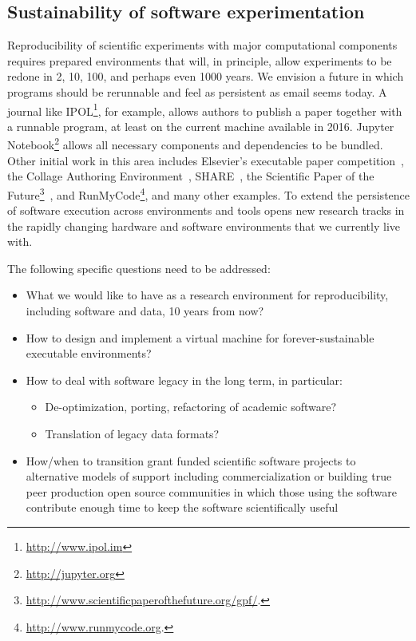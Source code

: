 \documentclass[a4paper,UKenglish]{dagman}
\begin{document}
\subsection{Sustainability of software experimentation}

Reproducibility of scientific experiments with major computational components requires prepared environments that will, in principle, allow experiments to be redone in 2, 10, 100, and perhaps even 1000 years. We envision a future in which programs should be rerunnable and feel as persistent as email seems today. A journal like IPOL\footnote{\url{http://www.ipol.im}}, for example, allows authors to publish a paper together with a runnable program, at least on the current machine available in 2016. Jupyter Notebook\footnote{\url{http://jupyter.org}} allows all necessary components and dependencies to be bundled. Other initial work in this area includes Elsevier's executable paper competition~\cite{execpapers}, the Collage Authoring Environment~\cite{NOWAKOWSKI2011608},
SHARE~\cite{DBLP:journals/procedia/GorpM11}, the Scientific Paper of the Future\footnote{\url{http://www.scientificpaperofthefuture.org/gpf/}.}~\cite{onto_soft_what_2016}, and RunMyCode\footnote{\url{http://www.runmycode.org}.}, and many other examples.
To extend the persistence of software execution across environments and tools opens new research tracks in the rapidly changing hardware and software environments that we currently live with.

The following specific questions need to be addressed:

\begin{itemize}
\item What we would like to have as a research environment for reproducibility, including  software and data, 10 years from now?
\item How to design and implement a virtual machine for forever-sustainable executable environments?
\item How to deal with software legacy in the long term, in particular:
    \begin{itemize}
    \item De-optimization, porting, refactoring of academic software?
    \item Translation of legacy data formats?
    \end{itemize}
\item How/when to transition grant funded scientific software projects to alternative models of support including commercialization or building true peer production open source communities in which those using the software contribute enough time to keep the software scientifically useful~\cite{howison2015understanding,howison_sustaining_2015,bietz_sustaining_2012,sustaining-research-projects}
\end{itemize}
\end{document}
